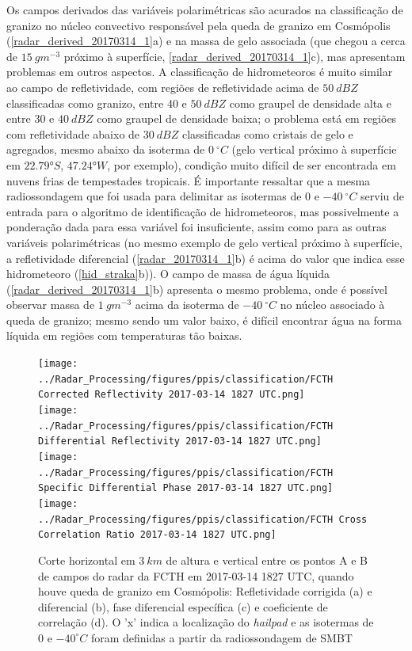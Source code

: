Os campos derivados das variáveis polarimétricas são acurados na classificação de granizo no núcleo convectivo responsável pela queda de granizo em Cosmópolis (\autoref{radar_derived_20170314_1}a) e na massa de gelo associada (que chegou a cerca de $15\:gm^{-3}$ próximo à superfície, \autoref{radar_derived_20170314_1}c), mas apresentam problemas em outros aspectos. A classificação de hidrometeoros é muito similar ao campo de refletividade, com regiões de refletividade acima de $50\:dBZ$ classificadas como granizo, entre 40 e $50\:dBZ$ como graupel de densidade alta e entre 30 e $40\:dBZ$ como graupel de densidade baixa; o problema está em regiões com refletividade abaixo de $30\:dBZ$ classificadas como cristais de gelo e agregados, mesmo abaixo da isoterma de $0\:^{\circ}C$ (gelo vertical próximo à superfície em $\ang{22.79}S$, $\ang{47.24}W$, por exemplo), condição muito difícil de ser encontrada em nuvens frias de tempestades tropicais. É importante ressaltar que a mesma radiossondagem que foi usada para delimitar as isotermas de 0 e $-40\:^{\circ}C$ serviu de entrada para o algoritmo de identificação de hidrometeoros, mas possivelmente a ponderação dada para essa variável foi insuficiente, assim como para as outras variáveis polarimétricas (no mesmo exemplo de gelo vertical próximo à superfície, a refletividade diferencial (\autoref{radar_20170314_1}b) é acima do valor que indica esse hidrometeoro (\autoref{hid_straka}b)). O campo de massa de água líquida (\autoref{radar_derived_20170314_1}b) apresenta o mesmo problema, onde é possível observar massa de $1\:gm^{-3}$ acima da isoterma de $-40\:^{\circ}C$ no núcleo associado à queda de granizo; mesmo sendo um valor baixo, é difícil encontrar água na forma líquida em regiões com temperaturas tão baixas.

\begin{figure}[hp]
	\centering
	\caption{Corte horizontal em $3\:km$ de altura e vertical entre os pontos A e B de campos do radar da FCTH em 2017-03-14 1827 UTC, quando houve queda de granizo em Cosmópolis: Refletividade corrigida (a) e diferencial (b), fase diferencial específica (c) e coeficiente de correlação (d). O 'x' indica a localização do \textit{hailpad} e as isotermas de $0$ e $-40^{\circ}C$ foram definidas a partir da radiossondagem de SMBT}
	\label{radar_20170314_1}
	\vspace{-5pt}
	\texttt{[image: ../Radar\_Processing/figures/ppis/classification/FCTH Corrected Reflectivity 2017-03-14 1827 UTC.png]} \\
	\vspace{-5pt}
	\texttt{[image: ../Radar\_Processing/figures/ppis/classification/FCTH Differential Reflectivity 2017-03-14 1827 UTC.png]} \\
	\vspace{-5pt}
	\texttt{[image: ../Radar\_Processing/figures/ppis/classification/FCTH Specific Differential Phase 2017-03-14 1827 UTC.png]} \\
	\vspace{-5pt}
	\texttt{[image: ../Radar\_Processing/figures/ppis/classification/FCTH Cross Correlation Ratio 2017-03-14 1827 UTC.png]} \\
\end{figure}

